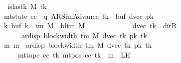 \begin{isabellebody}
\ \ \ \ \ \ \ \ \ \ \ \ \ {\isasymnot}\ is{\isacharunderscore}{\kern0pt}last{\isacharunderscore}{\kern0pt}k\ M\ tk{\isacharprime}{\kern0pt}{\isacharsemicolon}{\kern0pt}\isanewline
\ \ \ \ \ \ \ \ \ \ \ \ \ mt{\isacharunderscore}{\kern0pt}state\ cc\ {\isacharequal}{\kern0pt}\ {\isacharparenleft}{\kern0pt}q{\isacharcomma}{\kern0pt}\ AR{\isacharunderscore}{\kern0pt}SimAdvance{\isacharcomma}{\kern0pt}\ tk{\isacharprime}{\kern0pt}{\isacharcomma}{\kern0pt}\ {}{\isacharcomma}{\kern0pt}\ buf{}{\isacharcomma}{\kern0pt}\ dvec{\isacharcomma}{\kern0pt}\ pk{\isacharprime}{\kern0pt}{\isacharparenright}{\kern0pt}{\isacharsemicolon}{\kern0pt}\isanewline
\ \ \ \ \ \ \ \ \ \ \ \ \ {\isasymforall}k{\isachardot}{\kern0pt}\ buf{}\ k\ {\isasymin}\ {\isasymGamma}{\isacharunderscore}{\kern0pt}tm\ M\ {\isasymunion}\ {\isacharbraceleft}{\kern0pt}bl{\isacharunderscore}{\kern0pt}tm\ M{\isacharbraceright}{\kern0pt}{\isacharsemicolon}{\kern0pt}\isanewline
\ \ \ \ \ \ \ \ \ \ \ \ \ dvec\ tk{\isacharprime}{\kern0pt}\ {\isasymnoteq}\ dir{\isachardot}{\kern0pt}R\isanewline
\ \ \ \ \ \ \ \ \ \ \ \ \ \ \ {\isasymLongrightarrow}\ {}\ {\isacharless}{\kern0pt}\ ar{\isacharunderscore}{\kern0pt}disp\ {\isacharparenleft}{\kern0pt}block{\isacharunderscore}{\kern0pt}width\ {\isacharparenleft}{\kern0pt}{\isasymGamma}{\isacharunderscore}{\kern0pt}tm\ M{\isacharparenright}{\kern0pt}{\isacharparenright}{\kern0pt}\ {\isacharparenleft}{\kern0pt}dvec\ tk{\isacharprime}{\kern0pt}{\isacharparenright}{\kern0pt}\ {\isacharparenleft}{\kern0pt}pk{\isacharprime}{\kern0pt}\ tk{\isacharprime}{\kern0pt}{\isacharparenright}{\kern0pt}{\isacharsemicolon}{\kern0pt}\isanewline
\ \ \ \ \ \ \ \ \ \ \ \ \ {\isasymAnd}m{\isachardot}{\kern0pt}\ m\ {\isacharless}{\kern0pt}\ ar{\isacharunderscore}{\kern0pt}disp\ {\isacharparenleft}{\kern0pt}block{\isacharunderscore}{\kern0pt}width\ {\isacharparenleft}{\kern0pt}{\isasymGamma}{\isacharunderscore}{\kern0pt}tm\ M{\isacharparenright}{\kern0pt}{\isacharparenright}{\kern0pt}\ {\isacharparenleft}{\kern0pt}dvec\ tk{\isacharprime}{\kern0pt}{\isacharparenright}{\kern0pt}\ {\isacharparenleft}{\kern0pt}pk{\isacharprime}{\kern0pt}\ tk{\isacharprime}{\kern0pt}{\isacharparenright}{\kern0pt}\isanewline
\ \ \ \ \ \ \ \ \ \ \ \ \ \ \ \ {\isasymLongrightarrow}\ mt{\isacharunderscore}{\kern0pt}tape\ cc\ tk{\isacharprime}{\kern0pt}\ {\isacharparenleft}{\kern0pt}mt{\isacharunderscore}{\kern0pt}pos\ cc\ tk{\isacharprime}{\kern0pt}\ {\isacharminus}{\kern0pt}\ m{\isacharparenright}{\kern0pt}\ {\isasymnoteq}\ LE{}{\isacharsemicolon}{\kern0pt}\isanewline

\end{isabellebody}
